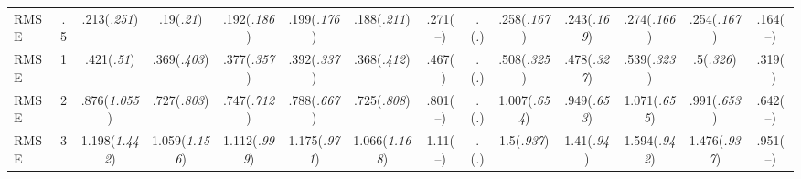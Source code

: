 \documentclass{article}
\begin{document}
\begin{table}[tbp]
{\begin{tabularx}{\textwidth}{lCCCCCCCCCCCCC}
\midrule RMSE&.5&.213\newline (\emph{.251})&.19\newline (\emph{.21})&.192\newline (\emph{.186})&.199\newline (\emph{.176})&.188\newline (\emph{.211})&.271\newline (--)&.\newline (\emph{.})&.258\newline (\emph{.167})&.243\newline (\emph{.169})&.274\newline (\emph{.166})&.254\newline (\emph{.167})&.164\newline (--) \tabularnewline
RMSE&1&.421\newline (\emph{.51})&.369\newline (\emph{.403})&.377\newline (\emph{.357})&.392\newline (\emph{.337})&.368\newline (\emph{.412})&.467\newline (--)&.\newline (\emph{.})&.508\newline (\emph{.325})&.478\newline (\emph{.327})&.539\newline (\emph{.323})&.5\newline (\emph{.326})&.319\newline (--) \tabularnewline
RMSE&2&.876\newline (\emph{1.055})&.727\newline (\emph{.803})&.747\newline (\emph{.712})&.788\newline (\emph{.667})&.725\newline (\emph{.808})&.801\newline (--)&.\newline (\emph{.})&1.007\newline (\emph{.654})&.949\newline (\emph{.653})&1.071\newline (\emph{.655})&.991\newline (\emph{.653})&.642\newline (--) \tabularnewline
RMSE&3&1.198\newline (\emph{1.442})&1.059\newline (\emph{1.156})&1.112\newline (\emph{.999})&1.175\newline (\emph{.971})&1.066\newline (\emph{1.168})&1.11\newline (--)&.\newline (\emph{.})&1.5\newline (\emph{.937})&1.41\newline (\emph{.94})&1.594\newline (\emph{.942})&1.476\newline (\emph{.937})&.951\newline (--) \tabularnewline

\end{tabularx}}
\end{table}
\end{document}
